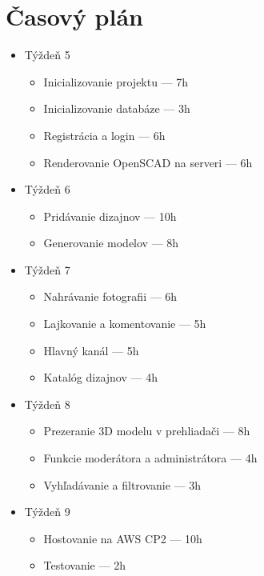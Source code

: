 \documentclass[a4paper]{article}
\begin{document}
\section{Časový plán}

\begin{itemize}
    \item Týždeň 5
    \begin{itemize}
        \item Inicializovanie projektu --- 7h
        \item Inicializovanie databáze --- 3h
        \item Registrácia a login --- 6h
        \item Renderovanie OpenSCAD na serveri --- 6h
    \end{itemize}
    \item Týždeň 6
    \begin{itemize}
        \item Pridávanie dizajnov --- 10h
        \item Generovanie modelov --- 8h
    \end{itemize}
    \item Týždeň 7
    \begin{itemize}
        \item Nahrávanie fotografii --- 6h
        \item Lajkovanie a komentovanie --- 5h
        \item Hlavný kanál --- 5h
        \item Katalóg dizajnov --- 4h
    \end{itemize}
    \item Týždeň 8
    \begin{itemize}
        \item Prezeranie 3D modelu v prehliadači --- 8h
        \item Funkcie moderátora a administrátora --- 4h
        \item Vyhľadávanie a filtrovanie --- 3h
    \end{itemize}
    \item Týždeň 9
    \begin{itemize}
        \item Hostovanie na AWS CP2 --- 10h
        \item Testovanie --- 2h

\end{itemize}
\end{itemize}
\end{document}
